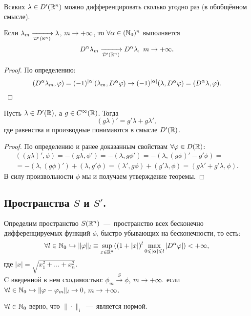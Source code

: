 \begin{note}
    Всяких $\lambda \in D'(\mathbb{R}^n)$ можно дифференцировать сколько угодно раз (в обобщённом смысле).
\end{note}
\begin{lemma}
    Если $\lambda_m \xrightarrow[\mathcal{D}'(\mathbb{R}^n)]{} \lambda$, $m \rightarrow +\infty$, то $\forall \alpha \in (\mathbb{N}_0)^n$ выполняется
    \[
        D^{\alpha} \lambda_m \xrightarrow[\mathcal{D}'(\mathbb{R}^n)]{} D^{\alpha} \lambda,\  m \rightarrow +\infty.
    \]
\end{lemma}
\begin{proof}
    По определению:
    \[
        (D^{\alpha} \lambda_m, \varphi) = (-1)^{|\alpha|} (\lambda_m, D^{\alpha} \varphi) \rightarrow (-1)^{|\alpha|}(\lambda, D^{\alpha}\varphi) = (D^{\alpha} \lambda, \varphi).
    \]
\end{proof}
\begin{theorem}
    Пусть $\lambda \in D'(\mathbb{R})$, а $g \in C^\infty(\mathbb{R})$.
    Тогда
    \[
        (g\lambda)' = g' \lambda + g \lambda',
    \]
    где равенства и производные понимаются в смысле $D'(\mathbb{R})$.
\end{theorem}
\begin{proof}
    По определению и ранее доказанным свойствам $\forall \varphi \in D(\mathbb{R})$:
    \begin{multline*}
        ((g\lambda)', \phi) = -(g \lambda, \phi') = -(\lambda, g \phi') = -(\lambda, (g\phi)' - g'\phi) = \\ = -(\lambda, (g\phi)') + (\lambda, g' \phi) = (\lambda', g\phi) + (g'\lambda, \phi) = (g\lambda' + g'\lambda, \phi).
    \end{multline*}
    В силу произвольности $\phi$ мы и получаем утверждение теоремы.
\end{proof}
\subsection{Пространства $S$ и $S'$.}
\begin{definition}
    Определим пространство $S(\mathbb{R}^n)$~---~пространство всех бесконечно дифференцируемых функций $\phi$, быстро убывающих на бесконечности, то есть:
    \[
        \forall l \in \mathbb{N}_0 \hookrightarrow \|\varphi\|_l \equiv \sup\limits_{x \in \mathbb{R}^n} ((1 + |x|)^l \max\limits_{0 \leqslant |\alpha| \leqslant l} |D^{\alpha} \varphi|) < +\infty,
    \]
    где $|x| = \sqrt{x_1^2 + \ldots + x_n^2}$.\\
    C введенной в нем сходимостью:
        $\phi_m \xrightarrow{S} \phi$, $m \rightarrow +\infty.$
    если $\forall l \in \mathbb{N}_0 \hookrightarrow \|\varphi - \varphi_m\|_l \rightarrow 0$, $m \rightarrow +\infty$.
\end{definition}
\begin{note}
    $\forall l \in \mathbb{N}_0$ верно, что $\|\cdot \|_l$~---~является нормой.
\end{note}

